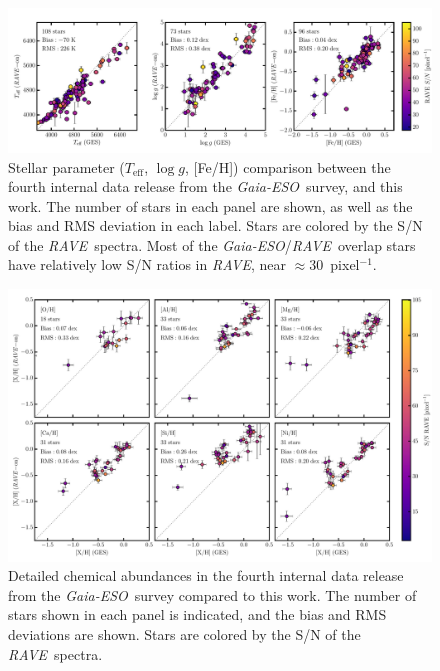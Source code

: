 \documentclass[preprint]{aastex61}
\newcommand{\acronym}[1]{{\small{#1}}}
\newcommand{\project}[1]{\textsl{#1}}
\newcommand{\rave}{\project{\acronym{RAVE}}}
\newcommand{\ges}{\project{Gaia-ESO}}
\newcommand{\teff}{T_{\mathrm{eff}}}
\newcommand{\logg}{\log g}
\begin{document}
\begin{figure}[p]
\includegraphics[width=\textwidth]{figures/ges-comparison.pdf}
\caption{Stellar parameter ($\teff$, $\logg$, [Fe/H]) comparison between the fourth internal data release from the \ges\ survey, and this work. The number of stars in each panel are shown, as well as the bias and RMS deviation in each label. Stars are colored by the S/N of the \rave\ spectra.  Most of the \ges/\rave\ overlap stars have relatively low S/N ratios in \rave, near $\approx 30$~pixel$^{-1}$.\label{fig:ges-stellar-parameters}}
\end{figure}


\begin{figure}[p]
\includegraphics[width=\textwidth]{figures/ges-abundances.pdf}
\caption{Detailed chemical abundances in the fourth internal data release from the \ges\ survey compared to this work.  The number of stars shown in each panel is indicated, and the bias and RMS deviations are shown. Stars are colored by the S/N of the \rave\ spectra.\label{fig:ges-abundances}}
\end{figure}
\end{document}
